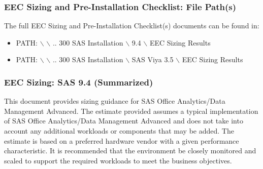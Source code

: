 \subsubsection{EEC Sizing and Pre-Installation Checklist: File Path(s)}

The full EEC Sizing and Pre-Installation Checklist(s) documents can be found in:
\begin{itemize}
    \item PATH: $\backslash$ $\backslash$ .. 300 SAS Installation $\backslash$ 9.4 $\backslash$ EEC Sizing Results
    \item PATH: $\backslash$ $\backslash$ .. 300 SAS Installation $\backslash$ SAS Viya 3.5 $\backslash$ EEC Sizing Results
\end{itemize}

\subsubsection{EEC Sizing: SAS 9.4 (Summarized)}
This document provides sizing guidance for SAS Office Analytics/Data Management Advanced. The estimate provided assumes a typical implementation of SAS Office Analytics/Data Management Advanced and does not take into account any additional workloads or components that may be added. The estimate is based on a preferred hardware vendor with a given performance characteristic. It is recommended that the environment be closely monitored and scaled to support the required workloads to meet the business objectives.

